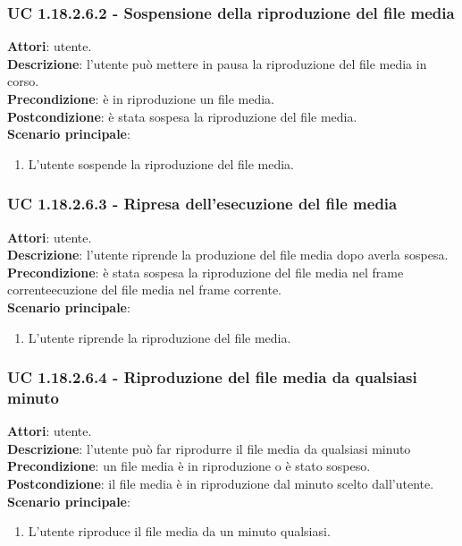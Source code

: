 	\subsubsection{UC 1.18.2.6.2 - Sospensione della riproduzione del file media}{
		\label{uc1.18.2.6.2}
		\textbf{Attori}: utente. \\
		\textbf{Descrizione}: l'utente può mettere in pausa la riproduzione del file media in corso. \\
		\textbf{Precondizione}: è in riproduzione un file media.	\\
		\textbf{Postcondizione}: è stata sospesa la riproduzione del file media.\\
		\textbf{Scenario principale}:
		\begin{enumerate}
			\item L'utente sospende la riproduzione del file media.
		\end{enumerate}				
	}
	\subsubsection{UC 1.18.2.6.3 - Ripresa dell'esecuzione del file media}{
		\label{uc1.18.2.6.3}
		\textbf{Attori}: utente. \\
		\textbf{Descrizione}: l'utente riprende la produzione del file media dopo averla sospesa. \\
		\textbf{Precondizione}: è stata sospesa la riproduzione del file media nel frame correnteecuzione del file media nel frame corrente.\\
		\textbf{Scenario principale}:
		\begin{enumerate}
			\item L'utente riprende la riproduzione del file media.
		\end{enumerate}				
	}
	\subsubsection{UC 1.18.2.6.4 - Riproduzione del file media da qualsiasi minuto}{
		\label{uc1.18.2.6.4}
		\textbf{Attori}: utente. \\
		\textbf{Descrizione}: l'utente può far riprodurre il file media da qualsiasi minuto
		\textbf{Precondizione}: un file media è in riproduzione o è stato sospeso.	\\
		\textbf{Postcondizione}: il file media è in riproduzione dal minuto scelto dall'utente.\\
		\textbf{Scenario principale}:
		\begin{enumerate}
			\item L'utente riproduce il file media da un minuto qualsiasi. 
		\end{enumerate}				
	}
